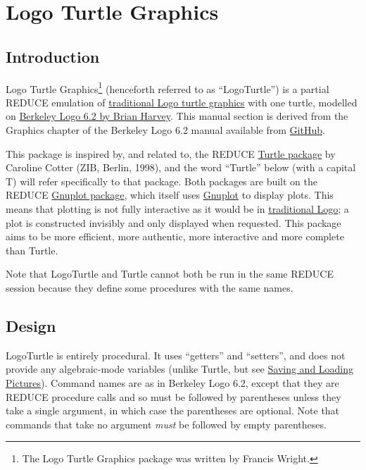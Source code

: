 \section{Logo Turtle Graphics}

\subsection{Introduction}

Logo Turtle Graphics\footnote{The Logo Turtle Graphics package was
written by Francis Wright.} (henceforth referred to as ``LogoTurtle'')
is a partial REDUCE emulation of
\href{https://en.wikipedia.org/wiki/Turtle_graphics}{traditional Logo
  turtle graphics} with one turtle, modelled on
\href{http://people.eecs.berkeley.edu/~bh/logo.html}{Berkeley Logo 6.2
  by Brian Harvey}.  This manual section is derived from the Graphics
chapter of the Berkeley Logo 6.2 manual available from
\href{https://github.com/jrincayc/ucblogo-code}{GitHub}.

This package is inspired by, and related to, the REDUCE
\hyperref[package:TURTLE]{Turtle package} by Caroline Cotter (ZIB,
Berlin, 1998), and the word ``Turtle'' below (with a capital T) will
refer specifically to that package.  Both packages are built on the
REDUCE \hyperref[package:GNUPLOT]{Gnuplot package}, which itself uses
\href{http://gnuplot.info/}{Gnuplot} to display plots.  This means
that plotting is not fully interactive as it would be in
\href{https://en.wikipedia.org/wiki/Logo_(programming_language)}{traditional
  Logo}; a plot is constructed invisibly and only displayed when
requested.  This package aims to be more efficient, more authentic,
more interactive and more complete than Turtle.

Note that LogoTurtle and Turtle cannot both be run in the same REDUCE
session because they define some procedures with the same names.

\subsection{Design}

LogoTurtle is entirely procedural.  It uses ``getters'' and
``setters'', and does not provide any algebraic-mode variables (unlike
Turtle, but see \hyperref[logoturtle:SLP]{Saving and Loading
  Pictures}).  Command names are as in Berkeley Logo 6.2, except that
they are REDUCE procedure calls and so must be followed by parentheses
unless they take a single argument, in which case the parentheses are
optional.  Note that commands that take no argument \emph{must} be
followed by empty parentheses.

